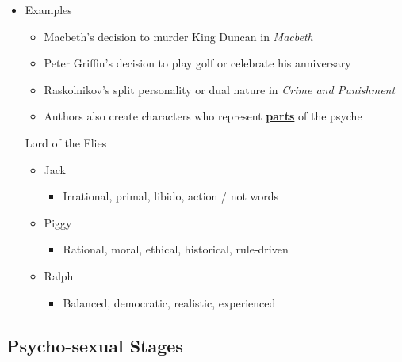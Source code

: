 \documentclass[11pt]{article}
\begin{document}
\begin{itemize}
\item Examples
\label{sec:org99107b6}
\begin{itemize}
\item Macbeth's decision to murder King Duncan in \emph{Macbeth}
\item Peter Griffin's decision to play golf or celebrate his anniversary
\item Raskolnikov's split personality or dual nature in \emph{Crime and Punishment}
\end{itemize}
\begin{itemize}
\item Authors also create characters who represent \uline{\textbf{parts}} of the psyche
\end{itemize}

Lord of the Flies

\begin{itemize}
\item Jack
\begin{itemize}
\item Irrational, primal, libido, action / not words
\end{itemize}
\item Piggy
\begin{itemize}
\item Rational, moral, ethical, historical, rule-driven
\end{itemize}
\item Ralph
\begin{itemize}
\item Balanced, democratic, realistic, experienced
\end{itemize}
\end{itemize}
\end{itemize}


\subsection*{Psycho-sexual Stages}
\label{sec:org4723c6d}

\subsection*{}
\label{sec:orgc31bb35}
\end{document}
